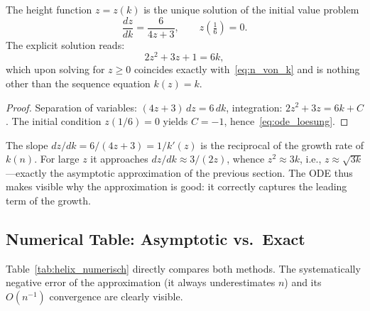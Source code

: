 \begin{satz}\label{satz:ode}
The height function $z = z(k)$ is the unique solution of the
initial value problem
\begin{equation}\label{eq:ode_hoehe}
  \frac{dz}{dk} = \frac{6}{4z+3}, \qquad z\!\left(\tfrac{1}{6}\right) = 0.
\end{equation}
The explicit solution reads:
\begin{equation}\label{eq:ode_loesung}
  2z^2 + 3z + 1 = 6k,
\end{equation}
which upon solving for $z \geq 0$ coincides exactly
with~\eqref{eq:n_von_k} and is nothing other than the sequence
equation $k(z) = k$.
\end{satz}

\begin{proof}
Separation of variables: $(4z+3)\,dz = 6\,dk$,
integration: $2z^2 + 3z = 6k + C$.
The initial condition $z(1/6) = 0$ yields $C = -1$,
hence~\eqref{eq:ode_loesung}.
\end{proof}

\begin{bemerkung}
The slope $dz/dk = 6/(4z+3) = 1/k'(z)$ is the reciprocal of the
growth rate of $k(n)$. For large $z$ it approaches
$dz/dk \approx 3/(2z)$, whence $z^2 \approx 3k$, i.e.,
$z \approx \sqrt{3k}$---exactly the asymptotic approximation
of the previous section. The ODE thus makes visible why the
approximation is good: it correctly captures the leading term
of the growth.
\end{bemerkung}

\subsection{Numerical Table: Asymptotic vs.\ Exact}
\label{subsec:tabelle}

Table~\ref{tab:helix_numerisch} directly compares both methods.
The systematically negative error of the approximation (it always
underestimates $n$) and its $O(n^{-1})$ convergence
are clearly visible.

